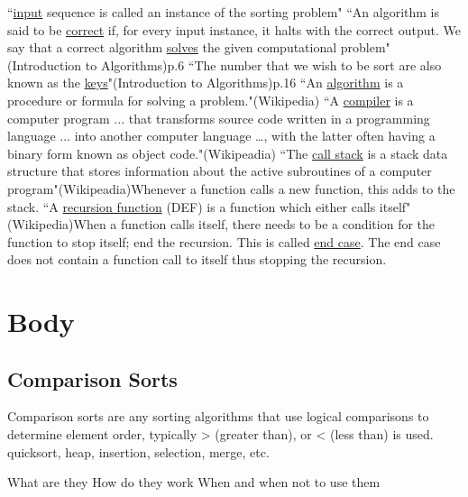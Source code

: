\documentclass[12pt]{article}
\begin{document}
	``\underline{input} sequence is called an instance of the sorting problem"\cite[p.~5]{intro}\newline
	``An algorithm is said to be \underline{correct} if, for every input instance, it halts with the correct output. We say that a correct algorithm \underline{solves} the given computational problem"\;(Introduction to Algorithms)\;p.6\newline
	``The number that we wish to be sort are also known as the \underline{keys}"\;(Introduction to Algorithms)\;p.16\newline
	``An \underline{algorithm} is a procedure or formula for solving a problem."\;(Wikipedia)\;\newline
	``A \underline{compiler} is a computer program ... that transforms source code written in a programming language ... into another computer language …, with the latter often having a binary form known as object code."\;(Wikipeadia)\;\newline
	``The \underline{call stack} is a stack data structure that stores information about the active subroutines of a computer program"\;(Wikipeadia)\;Whenever a function calls a new function, this adds to the stack.\newline
	``A \underline{recursion function} (DEF) is a function which either calls itself"\;(Wikipedia)\;When a function calls itself, there needs to be a condition for the function to stop itself; end the recursion. This is called \underline{end case}. The end case does not contain a function call to itself thus stopping the recursion.\newline
	
	\section{Body}
	
	\subsection{Comparison Sorts}
	Comparison sorts are any sorting algorithms that use logical comparisons to determine element order, typically > (greater than), or < (less than)  is used.
	quicksort, heap, insertion, selection, merge, etc.
	

	
	What are they
	How do they work
	When and when not to use them
	
	
	
	
\end{document}
